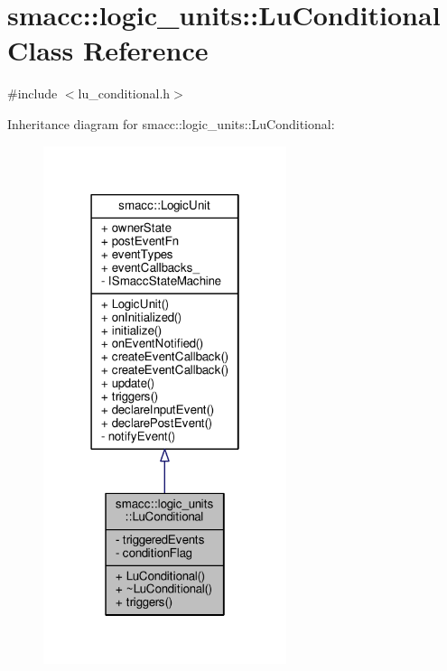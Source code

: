 \hypertarget{classsmacc_1_1logic__units_1_1LuConditional}{}\section{smacc\+:\+:logic\+\_\+units\+:\+:Lu\+Conditional Class Reference}
\label{classsmacc_1_1logic__units_1_1LuConditional}


{\ttfamily \#include $<$lu\+\_\+conditional.\+h$>$}



Inheritance diagram for smacc\+:\+:logic\+\_\+units\+:\+:Lu\+Conditional\+:\nopagebreak
\begin{figure}[H]
\begin{center}
\leavevmode
\includegraphics[width=202pt]{classsmacc_1_1logic__units_1_1LuConditional__inherit__graph}
\end{center}
\end{figure}


